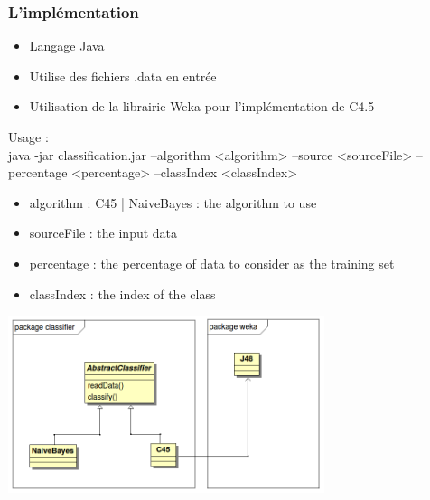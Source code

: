 \begin{frame}
 \frametitle{L'implémentation}

\begin{itemize}
 \item Langage Java
 \item Utilise des fichiers .data en entrée
 \item Utilisation de la librairie Weka pour l'implémentation de C4.5
\end{itemize}
Usage : \\
java -jar classification.jar --algorithm <algorithm> --source <sourceFile> --percentage <percentage> --classIndex <classIndex>
  \begin{itemize}
    \item algorithm : C45 | NaiveBayes : the algorithm to use 
    \item sourceFile : the input data
    \item percentage : the percentage of data to consider as the training set
    \item classIndex : the index of the class
  \end{itemize}
\end{frame}

 \begin{frame}[plain]
\begin{agrandirmarges}{1cm}{1cm}
 \begin{center}

\includegraphics[width=350px]{classDiagram.png}
\end{center}

\end{agrandirmarges}


\end{frame}
 